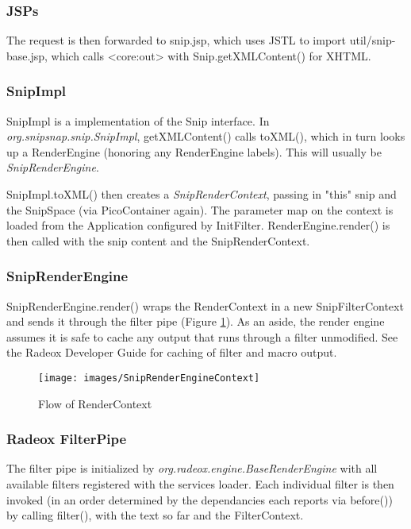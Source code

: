\documentclass[a4paper,pdftex]{article}
\begin{document}
\subsubsection{JSPs}
The request is then forwarded to snip.jsp, which uses JSTL\cite{JSTL} to
import util/snip-base.jsp, which calls  <core:out> with Snip.getXMLContent() 
for XHTML.

\subsubsection{SnipImpl}
SnipImpl is a implementation of the Snip interface. In \textit{org.snipsnap.snip.SnipImpl}, 
getXMLContent() calls toXML(),  which in turn looks up a RenderEngine (honoring any RenderEngine labels).  
This will usually be \textit{SnipRenderEngine}.

SnipImpl.toXML() then creates a \textit{SnipRenderContext}, 
passing in "this" snip and the SnipSpace (via PicoContainer again). 
The parameter map on the context is loaded from the Application configured by InitFilter.
RenderEngine.render() is then called with the snip content and the SnipRenderContext.

\subsubsection{SnipRenderEngine}

SnipRenderEngine.render() wraps the RenderContext in a new SnipFilterContext
and sends it through the filter pipe (Figure \ref{RenderContext}). 
As an aside, the render engine assumes it is safe to cache any output that runs through a filter unmodified. 
See the Radeox Developer Guide for caching of filter and macro output.

\begin{figure}[ht]
  \centering
    \texttt{[image: images/SnipRenderEngineContext]}
     \caption{\small\textsf Flow of RenderContext}
     \label{RenderContext}
\end{figure}

\subsubsection{Radeox FilterPipe}
The filter pipe is initialized by \textit{org.radeox.engine.BaseRenderEngine }with all available filters registered 
with the services loader.  Each individual filter is then invoked (in an order determined by the dependancies 
each reports via before()) by calling filter(), with the text so far and the FilterContext.
\end{document}
